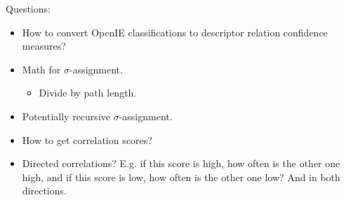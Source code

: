 \documentclass[a4paper]{article}
\begin{document}
Questions:
\begin{itemize}
    \item How to convert OpenIE classifications to descriptor relation
        confidence measures?
    \item Math for $\sigma$-assignment.
    \begin{itemize}
        \item Divide by path length.
    \end{itemize}
    \item Potentially recursive $\sigma$-assignment.
    \item How to get correlation scores?
    \item Directed correlations? 
        E.g. if this score is high, how often is the other one high, and 
        if this score is low, how often is the other one low? And in both
        directions.
\end{itemize}
\end{document}
